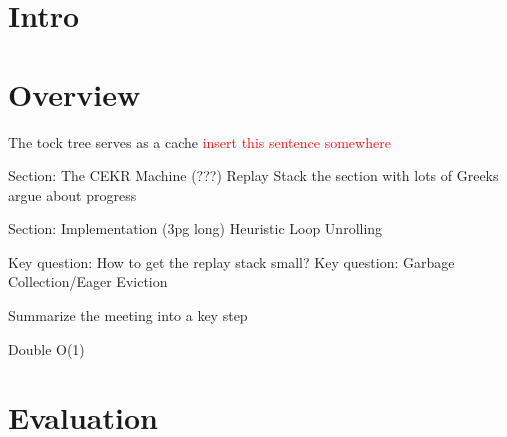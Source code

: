 \documentclass[acmsmall]{acmart}
\newcommand\todo[1]{\textcolor{red}{#1}}
\begin{document}

\maketitle


\section{Intro}

\section{Overview}	
The tock tree serves as a cache \todo{insert this sentence somewhere}

Section: The CEKR Machine (???)
Replay Stack
the section with lots of Greeks
argue about progress

Section: Implementation (3pg long)
Heuristic
Loop Unrolling

Key question: How to get the replay stack small?
Key question: Garbage Collection/Eager Eviction

Summarize the meeting into a key step

Double O(1)




\section{Evaluation}
%
%
%
%
%
%
%

% 
\end{document}
